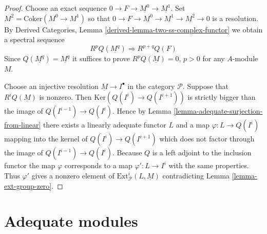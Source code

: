 \begin{proof}
Choose an exact sequence $0 \to F \to \underline{M^0} \to \underline{M^1}$.
Set $M^2 = \text{Coker}(M^0 \to M^1)$ so that
$0 \to F \to \underline{M^0} \to \underline{M^1}
\to \underline{M^2} \to 0$ is a resolution. By
Derived Categories, Lemma \ref{derived-lemma-two-ss-complex-functor}
we obtain a spectral sequence
$$
R^pQ(\underline{M^q}) \Rightarrow R^{p + q}Q(F)
$$
Since $Q(\underline{M^q}) = \underline{M^q}$ it suffices to prove
$R^pQ(\underline{M}) = 0$, $p > 0$ for any $A$-module $M$.

\medskip\noindent
Choose an injective resolution $\underline{M} \to I^\bullet$ in
the category $\mathcal{P}$. Suppose that $R^iQ(\underline{M})$ is nonzero.
Then $\text{Ker}(Q(I^i) \to Q(I^{i + 1}))$ is strictly bigger
than the image of $Q(I^{i - 1}) \to Q(I^i)$. Hence by
Lemma \ref{lemma-adequate-surjection-from-linear}
there exists a linearly adequate functor $L$ and a map
$\varphi : L \to Q(I^i)$ mapping into the kernel of $Q(I^i) \to Q(I^{i + 1})$
which does not factor through the image of $Q(I^{i - 1}) \to Q(I^i)$.
Because $Q$ is a left adjoint to the inclusion functor the map
$\varphi$ corresponds to a map $\varphi' : L \to I^i$ with the same properties.
Thus $\varphi'$ gives a nonzero element of
$\text{Ext}^i_\mathcal{P}(L, \underline{M})$ contradicting
Lemma \ref{lemma-ext-group-zero}.
\end{proof}














\section{Adequate modules}
\label{section-adequate}

